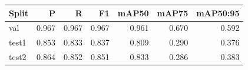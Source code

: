 \begin{tabular}{lrrrrrr}
\toprule
Split & P & R & F1 & mAP50 & mAP75 & mAP50:95 \\
\midrule
val & 0.967 & 0.967 & 0.967 & 0.961 & 0.670 & 0.592 \\
test1 & 0.853 & 0.833 & 0.837 & 0.809 & 0.290 & 0.376 \\
test2 & 0.864 & 0.852 & 0.851 & 0.833 & 0.286 & 0.383 \\
\bottomrule
\end{tabular}
